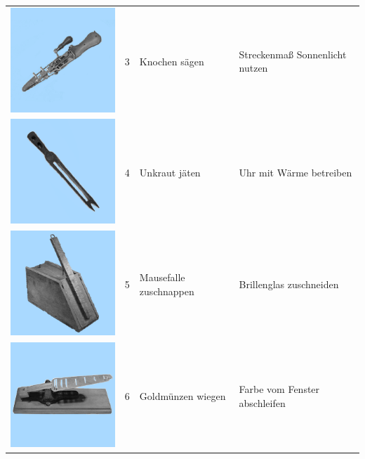 \documentclass[
  english,
  doc,12pt,twoside,floatsintext]{apa7}
\begin{document}
\begin{center}
\begin{ThreePartTable}
\begin{longtable}{llll}
\includegraphics[valign=c, scale=0.19]{../materials/unfamiliar/3.png} & 3 & Knochen sägen & Streckenmaß Sonnenlicht nutzen\\
\includegraphics[valign=c, scale=0.19]{../materials/unfamiliar/4.png} & 4 & Unkraut jäten & Uhr mit Wärme betreiben\\
\includegraphics[valign=c, scale=0.19]{../materials/unfamiliar/5.png} & 5 & Mausefalle zuschnappen & Brillenglas zuschneiden\\
\includegraphics[valign=c, scale=0.19]{../materials/unfamiliar/6.png} & 6 & Goldmünzen wiegen & Farbe vom Fenster abschleifen\\

\end{longtable}
\end{ThreePartTable}
\end{center}
\end{document}
